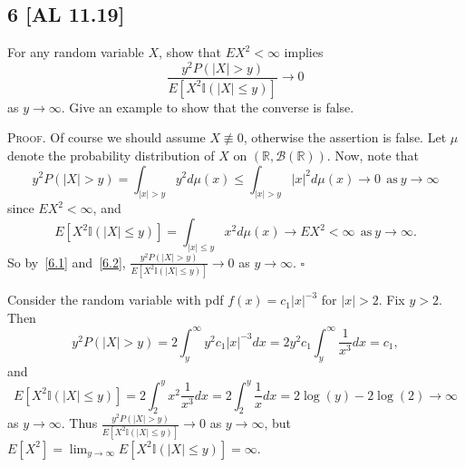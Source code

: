\documentclass[12pt]{article}
\newcounter{ProofCounter}
\newenvironment{Proof}{\stepcounter{ProofCounter}\textsc{Proof.}}{\hfill$\square$}
\begin{document}
\subsection*{6 [AL 11.19]}
\begin{tcolorbox}
  For any random variable $X$, show that $EX^{2} < \infty$ implies 
  \[
    \frac{y^{2}P(|X| > y)}{E[X^{2}\mathbb{I} (|X| \leq y)]} \rightarrow 0
  \]
  as $y \rightarrow\infty$. Give an example to show that the converse is false.
\end{tcolorbox}
\begin{Proof}
  Of course we should assume $X \not\equiv 0$, otherwise the assertion is false. Let $\mu$ denote the probability distribution of $X$ on
  $(\mathbb{R},\mathcal{B}(\mathbb{R}))$. Now, note that
  \begin{equation}
    y^{2}P(|X| > y) = \int_{|x| > y}y^{2}d\mu(x) \leq \int_{|x| > y}|x|^{2}d\mu(x) \rightarrow 0\ \ \text{as}\ y \rightarrow \infty
    \label{6.1}
  \end{equation}
  since $EX^{2} < \infty$, and 
  \begin{equation}
    E[X^{2}\mathbb{I} (|X| \leq y)] = \int_{|x| \leq y}x^{2}d\mu(x) \rightarrow EX^{2} < \infty \ \ \text{as} \ y \rightarrow \infty.
    \label{6.2}
  \end{equation}
  So by~\eqref{6.1} and~\eqref{6.2}, $\frac{y^{2}P(|X| > y)}{E[X^{2}\mathbb{I} (|X| \leq y)]} \rightarrow 0$ as $y \rightarrow \infty$.
\end{Proof}

\vspace{5mm}
Consider the random variable with pdf $f(x) = c_{1}|x|^{-3}$ for $|x| > 2$. Fix $y > 2$. Then
\[ y^{2}P(|X| > y) = 2\int_{y}^{\infty}y^{2}c_{1}|x|^{-3}dx = 2y^{2}c_{1}\int_{y}^{\infty}\frac{1}{x^{3}}dx = c_{1}, \]
and 
\[ E[X^{2}\mathbb{I} (|X| \leq y)] = 2\int_{2}^{y}x^{2}\frac{1}{x^{3}}dx = 2\int_{2}^{y}\frac{1}{x}dx = 2\log(y) - 2\log(2) \rightarrow \infty \]
as $y \rightarrow \infty$. Thus $\frac{y^{2}P(|X| > y)}{E[X^{2}\mathbb{I} (|X| \leq y)]} \rightarrow 0$ as $y \rightarrow \infty$, but 
$E[X^{2}] = \lim_{y\rightarrow\infty}E[X^{2}\mathbb{I} (|X| \leq y)] = \infty$.
\end{document}
